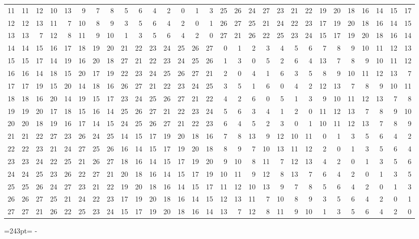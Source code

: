 \documentclass[10pt,a4paper]{article}
\newcommand{\needspace}[1]{\par\penalty-100\begingroup\dimen0=#1\relax\dimen2=\pagegoal
  \advance\dimen2-\pagetotal\ifdim\dimen0>\dimen2\relax\ifdim\dimen2>0pt\vfil\break\fi\fi
  \endgroup}
\numberwithin{equation}{section}
\begin{document}
{\begin{longtable}{@{}r|rrrrrrrrrrrrrrrrrrrrrrrrrrrr@{}}
11 & 11 & 12 & 10 & 13 & 9 & 7 & 8 & 5 & 6 & 4 & 2 & 0 & 1 & 3 & 25 & 26 & 24 & 27 & 23 & 21 & 22 & 19 & 20 & 18 & 16 & 14 & 15 & 17\\
12 & 12 & 13 & 11 & 7 & 10 & 8 & 9 & 3 & 5 & 6 & 4 & 2 & 0 & 1 & 26 & 27 & 25 & 21 & 24 & 22 & 23 & 17 & 19 & 20 & 18 & 16 & 14 & 15\\
13 & 13 & 7 & 12 & 8 & 11 & 9 & 10 & 1 & 3 & 5 & 6 & 4 & 2 & 0 & 27 & 21 & 26 & 22 & 25 & 23 & 24 & 15 & 17 & 19 & 20 & 18 & 16 & 14\\
14 & 14 & 15 & 16 & 17 & 18 & 19 & 20 & 21 & 22 & 23 & 24 & 25 & 26 & 27 & 0 & 1 & 2 & 3 & 4 & 5 & 6 & 7 & 8 & 9 & 10 & 11 & 12 & 13\\
15 & 15 & 17 & 14 & 19 & 16 & 20 & 18 & 27 & 21 & 22 & 23 & 24 & 25 & 26 & 1 & 3 & 0 & 5 & 2 & 6 & 4 & 13 & 7 & 8 & 9 & 10 & 11 & 12\\
16 & 16 & 14 & 18 & 15 & 20 & 17 & 19 & 22 & 23 & 24 & 25 & 26 & 27 & 21 & 2 & 0 & 4 & 1 & 6 & 3 & 5 & 8 & 9 & 10 & 11 & 12 & 13 & 7\\
17 & 17 & 19 & 15 & 20 & 14 & 18 & 16 & 26 & 27 & 21 & 22 & 23 & 24 & 25 & 3 & 5 & 1 & 6 & 0 & 4 & 2 & 12 & 13 & 7 & 8 & 9 & 10 & 11\\
18 & 18 & 16 & 20 & 14 & 19 & 15 & 17 & 23 & 24 & 25 & 26 & 27 & 21 & 22 & 4 & 2 & 6 & 0 & 5 & 1 & 3 & 9 & 10 & 11 & 12 & 13 & 7 & 8\\
19 & 19 & 20 & 17 & 18 & 15 & 16 & 14 & 25 & 26 & 27 & 21 & 22 & 23 & 24 & 5 & 6 & 3 & 4 & 1 & 2 & 0 & 11 & 12 & 13 & 7 & 8 & 9 & 10\\
20 & 20 & 18 & 19 & 16 & 17 & 14 & 15 & 24 & 25 & 26 & 27 & 21 & 22 & 23 & 6 & 4 & 5 & 2 & 3 & 0 & 1 & 10 & 11 & 12 & 13 & 7 & 8 & 9\\
21 & 21 & 22 & 27 & 23 & 26 & 24 & 25 & 14 & 15 & 17 & 19 & 20 & 18 & 16 & 7 & 8 & 13 & 9 & 12 & 10 & 11 & 0 & 1 & 3 & 5 & 6 & 4 & 2\\
22 & 22 & 23 & 21 & 24 & 27 & 25 & 26 & 16 & 14 & 15 & 17 & 19 & 20 & 18 & 8 & 9 & 7 & 10 & 13 & 11 & 12 & 2 & 0 & 1 & 3 & 5 & 6 & 4\\
23 & 23 & 24 & 22 & 25 & 21 & 26 & 27 & 18 & 16 & 14 & 15 & 17 & 19 & 20 & 9 & 10 & 8 & 11 & 7 & 12 & 13 & 4 & 2 & 0 & 1 & 3 & 5 & 6\\
24 & 24 & 25 & 23 & 26 & 22 & 27 & 21 & 20 & 18 & 16 & 14 & 15 & 17 & 19 & 10 & 11 & 9 & 12 & 8 & 13 & 7 & 6 & 4 & 2 & 0 & 1 & 3 & 5\\
25 & 25 & 26 & 24 & 27 & 23 & 21 & 22 & 19 & 20 & 18 & 16 & 14 & 15 & 17 & 11 & 12 & 10 & 13 & 9 & 7 & 8 & 5 & 6 & 4 & 2 & 0 & 1 & 3\\
26 & 26 & 27 & 25 & 21 & 24 & 22 & 23 & 17 & 19 & 20 & 18 & 16 & 14 & 15 & 12 & 13 & 11 & 7 & 10 & 8 & 9 & 3 & 5 & 6 & 4 & 2 & 0 & 1\\*
27 & 27 & 21 & 26 & 22 & 25 & 23 & 24 & 15 & 17 & 19 & 20 & 18 & 16 & 14 & 13 & 7 & 12 & 8 & 11 & 9 & 10 & 1 & 3 & 5 & 6 & 4 & 2 & 0\\
\bottomrule\end{longtable}}
\needspace{243pt}
\end{document}
